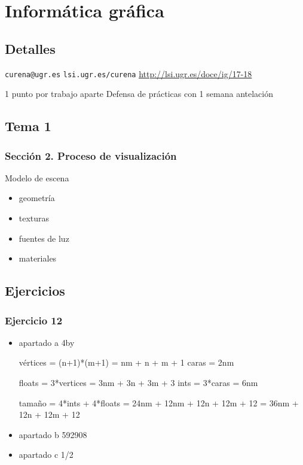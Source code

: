 \documentclass[11pt]{article}
\begin{document}
\section*{Informática gráfica}
\label{sec-10}
\subsection*{Detalles}
\label{sec-10-1}
\texttt{curena@ugr.es}
\texttt{lsi.ugr.es/curena}
\url{http://lsi.ugr.es/doce/ig/17-18}

1 punto por trabajo aparte
Defensa de prácticas con 1 semana antelación

\subsection*{Tema 1}
\label{sec-10-2}
\subsubsection*{Sección 2. Proceso de visualización}
\label{sec-10-2-1}
Modelo de escena

\begin{itemize}
\item geometría
\item texturas
\item fuentes de luz
\item materiales
\end{itemize}

\subsection*{Ejercicios}
\label{sec-10-3}
\subsubsection*{Ejercicio 12}
\label{sec-10-3-1}
\begin{itemize}
\item apartado a
\label{sec-10-3-1-1}
4by

vértices = (n+1)*(m+1) = nm + n + m + 1
caras = 2nm

floats = 3*vertices = 3nm + 3n + 3m + 3
ints = 3*caras = 6nm

tamaño = 4*ints + 4*floats = 24nm + 12nm + 12n + 12m + 12 = 36nm + 12n + 12m + 12

\item apartado b
\label{sec-10-3-1-2}
592908

\item apartado c
\label{sec-10-3-1-3}
1/2
\end{itemize}
\end{document}
